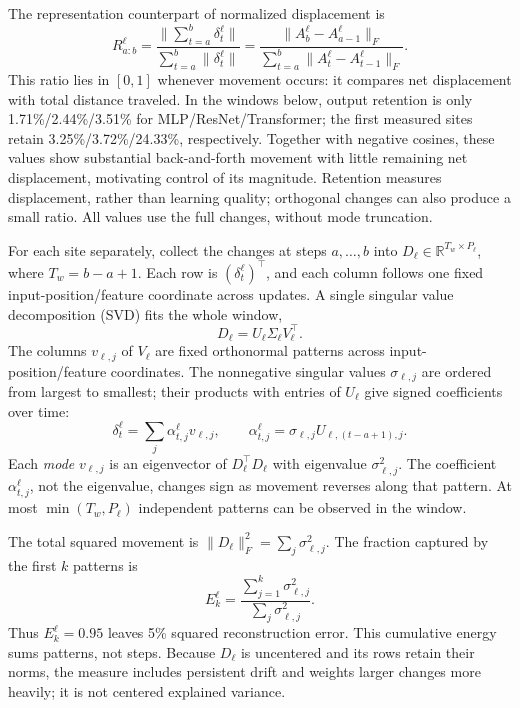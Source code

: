 The representation counterpart of normalized displacement is
\begin{equation}
 R_{a:b}^\ell=
 \frac{\|\sum_{t=a}^b\delta_t^\ell\|}{\sum_{t=a}^b\|\delta_t^\ell\|}
 =\frac{\|A_b^\ell-A_{a-1}^\ell\|_F}
 {\sum_{t=a}^b\|A_t^\ell-A_{t-1}^\ell\|_F}.
 \label{eq:representation-retention}
\end{equation}
This ratio lies in $[0,1]$ whenever movement occurs: it compares net
displacement with total distance traveled. In the windows below, output
retention is only 1.71\%/2.44\%/3.51\% for MLP/ResNet/Transformer;
the first measured sites retain 3.25\%/3.72\%/24.33\%, respectively.
Together with negative cosines, these values show substantial
back-and-forth movement with little remaining net displacement,
motivating control of its magnitude. Retention measures displacement,
rather than learning quality; orthogonal changes can also produce a
small ratio. All values use the full changes, without mode truncation.

For each site separately, collect the
changes at steps $a,\ldots,b$ into
$D_\ell\in\mathbb R^{T_w\times P_\ell}$, where $T_w=b-a+1$.
Each row is $(\delta_t^\ell)^\top$, and each column follows one fixed
input-position/feature coordinate across updates. A single singular
value decomposition (SVD) fits the whole window,
\begin{equation}
 D_\ell=U_\ell\Sigma_\ell V_\ell^\top.
 \label{eq:temporal-svd}
\end{equation}
The columns $v_{\ell,j}$ of $V_\ell$ are fixed orthonormal patterns
across input-position/feature coordinates. The nonnegative singular
values $\sigma_{\ell,j}$ are ordered from largest to smallest; their
products with entries of $U_\ell$ give signed coefficients over time:
\begin{equation}
 \delta_t^\ell=\sum_j\alpha_{t,j}^\ell v_{\ell,j},\qquad
 \alpha_{t,j}^\ell=\sigma_{\ell,j}U_{\ell,(t-a+1),j}.
 \label{eq:pattern-reconstruction}
\end{equation}
Each \emph{mode} $v_{\ell,j}$ is an eigenvector of
$D_\ell^\top D_\ell$ with eigenvalue $\sigma_{\ell,j}^2$. The coefficient
$\alpha_{t,j}^\ell$, not the eigenvalue, changes sign as movement reverses
along that pattern. At most $\min(T_w,P_\ell)$ independent patterns can
be observed in the window.

The total squared movement is $\|D_\ell\|_F^2=\sum_j\sigma_{\ell,j}^2$.
The fraction captured by the first $k$ patterns is
\begin{equation}
 E_k^\ell=\frac{\sum_{j=1}^k\sigma_{\ell,j}^2}
 {\sum_j\sigma_{\ell,j}^2}.
 \label{eq:energy}
\end{equation}
Thus $E_k^\ell=0.95$ leaves 5\% squared reconstruction error. This
cumulative energy sums patterns, not steps. Because $D_\ell$ is uncentered
and its rows retain their norms, the measure includes persistent drift
and weights larger changes more heavily; it is not centered explained
variance.

